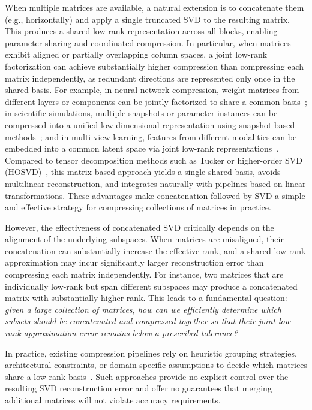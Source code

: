 \documentclass[10pt]{article} %
\begin{document}
When multiple matrices are available, a natural extension is to concatenate them (e.g., horizontally) and apply a single truncated SVD to the resulting matrix.
This produces a shared low-rank representation across all blocks, enabling parameter sharing and coordinated compression.
In particular, when matrices exhibit aligned or partially overlapping column spaces, a joint low-rank factorization can achieve substantially higher compression than compressing each matrix independently, as redundant directions are represented only once in the shared basis.
For example, in neural network compression, weight matrices from different layers or components can be jointly factorized to share a common basis~\citep{wang2025qsvd,lu2025skipcat,wang2025commonkv,li2025submoe};
in scientific simulations, multiple snapshots or parameter instances can be compressed into a unified low-dimensional representation using snapshot-based methods~\citep{sirovich1987turbulence};
and in multi-view learning, features from different modalities can be embedded into a common latent space via joint low-rank representations~\citep{hardoon2004canonical,kumar2011co}.
Compared to tensor decomposition methods such as Tucker or higher-order SVD (HOSVD)~\citep{tucker1966, hosvd_1999, de_lathauwer_2000, tensor_vs_matrix_tradeoffs}, this matrix-based approach yields a single shared basis, avoids multilinear reconstruction, and integrates naturally with pipelines based on linear transformations.
These advantages make concatenation followed by SVD a simple and effective strategy for compressing collections of matrices in practice.

However, the effectiveness of concatenated SVD critically depends on the alignment of the underlying subspaces.
When matrices are misaligned, their concatenation can substantially increase the effective rank, and a shared low-rank approximation may incur significantly larger reconstruction error than compressing each matrix independently.
For instance, two matrices that are individually low-rank but span different subspaces may produce a concatenated matrix with substantially higher rank.
This leads to a fundamental question: \emph{given a large collection of matrices, how can we efficiently determine which subsets should be concatenated and compressed together so that their joint low-rank approximation error remains below a prescribed tolerance?}

In practice, existing compression pipelines rely on heuristic grouping strategies, architectural constraints, or domain-specific assumptions to decide which matrices share a low-rank basis~\citep{wang2025qsvd, lu2025skipcat, li2025submoe}.
Such approaches provide no explicit control over the resulting SVD reconstruction error and offer no guarantees that merging additional matrices will not violate accuracy requirements.
\end{document}
